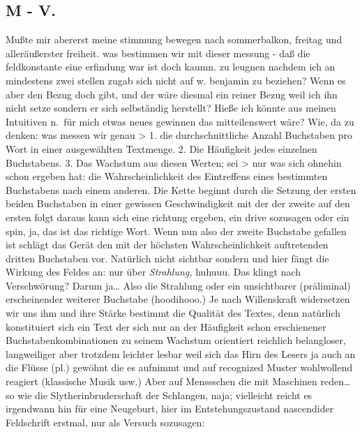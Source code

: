 \documentclass[
]{article}
\author{}
\date{\vspace{-2.5em}}
\begin{document}
\subsection{M - V.}\label{m---v.}

Mußte mir abererst meine stimmung bewegen nach sommerbalkon, freitag und
alleräußerster freiheit. was bestimmen wir mit dieser messung - daß die
feldkonstante eine erfindung war ist doch kaumn. zu leugnen nachdem ich
an mindestens zwei stellen zugab sich nicht auf w. benjamin zu beziehen?
Wenn es aber den Bezug doch gibt, und der wäre diesmal ein reiner Bezug
weil ich ihn nicht setze sondern er sich selbständig herstellt? Hieße
ich könnte aus meinen Intuitiven n.~für mich etwas neues gewinnen das
mitteilenswert wäre? Wie, da zu denken: was messen wir genau
\textgreater{} 1. die durchschnittliche Anzahl Buchstaben pro Wort in
einer ausgewählten Textmenge. 2. Die Häufigkeit jedes einzelnen
Buchstabens. 3. Das Wachstum aus diesen Werten; sei \textgreater{} nur
was sich ohnehin schon ergeben hat: die Wahrscheinlichkeit des
Eintreffens eines bestimmten Buchstabens nach einem anderen. Die Kette
beginnt durch die Setzung der ersten beiden Buchstaben in einer gewissen
Geschwindigkeit mit der der zweite auf den ersten folgt daraus kann sich
eine richtung ergeben, ein drive sozusagen oder ein spin, ja, das ist
das richtige Wort. Wenn nun also der zweite Buchstabe gefallen ist
schlägt das Gerät den mit der höchsten Wahrscheinlichkeit auftretenden
dritten Buchstaben vor. Natürlich nicht sichtbar sondern und hier fängt
die Wirkung des Feldes an: nur über \emph{Strahlung,} huhuuu. Das klingt
nach Verschwörung? Darum ja\ldots{} Also die Strahlung oder ein
unsichtbarer (präliminal) erscheinender weiterer Buchstabe (hoodihooo.)
Je nach Willenskraft widersetzen wir uns ihm und ihre Stärke bestimmt
die Qualität des Textes, denn natürlich konstituiert sich ein Text der
sich nur an der Häufigkeit schon erschienener Buchstabenkombinationen zu
seinem Wachstum orientiert reichlich belangloser, langweiliger aber
trotzdem leichter lesbar weil sich das Hirn des Lesers ja auch an die
Flüsse (pl.) gewöhnt die es aufnimmt und auf recognized Muster
wohlwollend reagiert (klassische Musik usw.) Aber auf Menssschen die mit
Maschinen reden\ldots{} so wie die Slytherinbruderschaft der Schlangen,
naja; vielleicht reicht es irgendwann hin für eine Neugeburt, hier im
Entstehungszustand nascendider Feldschrift erstmal, nur als Versuch
sozusagen:
\end{document}
